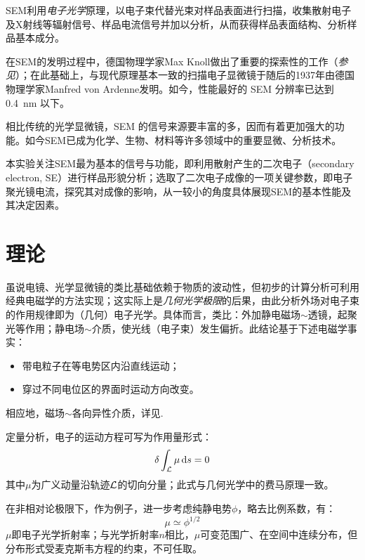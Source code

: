 \documentclass[aps,pre,12pt,preprint,%
	onecolumn,showpacs,showkeys,nofootinbib]{revtex4-1}
\begin{document}
\newpage
	SEM利用\textit{电子光学}原理，以电子束代替光束对样品表面进行扫描，收集散射电子及X射线等辐射信号、样品电流信号并加以分析，从而获得样品表面结构、分析样品基本成分。
	
	在SEM的发明过程中，德国物理学家Max Knoll做出了重要的探索性的工作（\textit{参见\cite{knoll1935aufladepotentiel}}）；在此基础上，与现代原理基本一致的扫描电子显微镜于随后的1937年由德国物理学家Manfred von Ardenne发明\supercite{mcmullan1995scanning}。如今，性能最好的 SEM 分辨率已达到 \SI{.4}{\nm} 以下\supercite{Nanotech86:online}。
	
	相比传统的光学显微镜，SEM 的信号来源要丰富的多，因而有着更加强大的功能。如今SEM已成为化学、生物、材料等许多领域中的重要显微、分析技术。
	
	本实验关注SEM最为基本的信号与功能，即利用散射产生的二次电子（secondary electron, SE）进行样品形貌分析；选取了二次电子成像的一项关键参数，即电子聚光镜电流，探究其对成像的影响，从一较小的角度具体展现SEM的基本性能及其决定因素。\vspace{-6ex}
\section{理论}
	\vspace{-2ex}
	虽说电镜、光学显微镜的类比基础依赖于物质的波动性，但初步的计算分析可利用经典电磁学的方法实现；这实际上是\textit{几何光学极限}的后果，由此分析外场对电子束的作用规律即为（几何）电子光学。具体而言，类比：外加静电磁场$\sim$透镜，起聚光等作用；静电场$\sim$介质，使光线（电子束）发生偏折。此结论基于下述电磁学事实：
	\begin{itemize}[noitemsep]
	\item 带电粒子在等电势区内沿直线运动；
	\item 穿过不同电位区的界面时运动方向改变。
	\end{itemize}
	相应地，磁场$\sim$各向异性介质，详见\cite{textbook}. 
	
	定量分析，电子的运动方程可写为作用量形式：
	\begin{equation}
		\var\int_{\mathcal{L}} \mu\dd{s} = 0
	\end{equation}
	其中$\mu$为广义动量沿轨迹$\mathcal{L}$的切向分量；此式与几何光学中的费马原理一致。
\pagebreak
	
	在非相对论极限下，作为例子，进一步考虑纯静电势$\phi$，略去比例系数，有\supercite{textbook}：
	\begin{equation}
		\mu \simeq \phi^{1/2}
	\end{equation}
	$\mu$即电子光学折射率；与光学折射率$n$相比，$\mu$可变范围广、在空间中连续分布，但分布形式受麦克斯韦方程的约束，不可任取。
	
\end{document}
